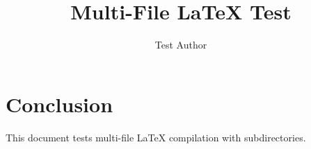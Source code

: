 \documentclass{article}
\title{Multi-File LaTeX Test}
\author{Test Author}
\begin{document}
\maketitle



\section{Conclusion}
This document tests multi-file LaTeX compilation with subdirectories.
\end{document}

